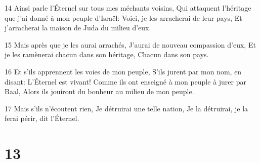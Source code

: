 \par 14 Ainsi parle l'Éternel sur tous mes méchants voisins, Qui attaquent l'héritage que j'ai donné à mon peuple d'Israël: Voici, je les arracherai de leur pays, Et j'arracherai la maison de Juda du milieu d'eux.
\par 15 Mais après que je les aurai arrachés, J'aurai de nouveau compassion d'eux, Et je les ramènerai chacun dans son héritage, Chacun dans son pays.
\par 16 Et s'ils apprennent les voies de mon peuple, S'ils jurent par mon nom, en disant: L'Éternel est vivant! Comme ils ont enseigné à mon peuple à jurer par Baal, Alors ils jouiront du bonheur au milieu de mon peuple.
\par 17 Mais s'ils n'écoutent rien, Je détruirai une telle nation, Je la détruirai, je la ferai périr, dit l'Éternel.

\chapter{13}

